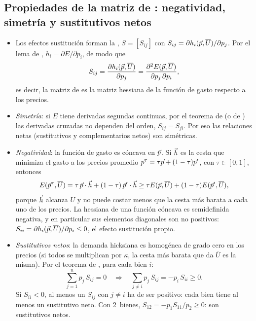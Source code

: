 \documentclass[11pt]{article}
\begin{document}
\subsection{Propiedades de la matriz de :\cortetitulo{} negatividad, simetría y sustitutivos netos}\label{der:matriz-slutsky}

\begin{itemize}
\item Los efectos sustitución forman la , $S=[S_{ij}]$ con $S_{ij}=\partial h_i(\vec{p},\overline{U})/\partial p_j$. Por el lema de , $h_i=\partial E/\partial p_i$, de modo que
  \begin{equation*}
  S_{ij}=\frac{\partial h_i(\vec{p},\overline{U})}{\partial p_j}=\frac{\partial^2E(\vec{p},\overline{U})}{\partial p_j\,\partial p_i},
  \end{equation*}
  es decir, la matriz de  es la matriz hessiana de la función de gasto respecto a los precios.
\item \emph{Simetría}: si $E$ tiene derivadas segundas continuas, por el teorema de  (o de ) las derivadas cruzadas no dependen del orden, $S_{ij}=S_{ji}$. Por eso las relaciones netas (sustitutivos y complementarios netos) son simétricas.
\item \emph{Negatividad}: la función de gasto es cóncava en $\vec{p}$. Si $\vec{h}$ es la cesta que minimiza el gasto a los precios promedio $\vec{p}^{\tau}=\tau \vec{p}+(1-\tau)\vec{p}'$, con $\tau\in[0,1]$, entonces
  \begin{equation*}
  E(\vec{p}^{\tau},\overline{U})=\tau\,\vec{p}\cdot\vec{h}+(1-\tau)\,\vec{p}'\cdot\vec{h}\geq\tau E(\vec{p},\overline{U})+(1-\tau)E(\vec{p}',\overline{U}),
  \end{equation*}
  porque $\vec{h}$ alcanza $\overline{U}$ y no puede costar menos que la cesta más barata a cada uno de los precios. La hessiana de una función cóncava es semidefinida negativa, y en particular sus elementos diagonales son no positivos: $S_{ii}=\partial h_i(\vec{p},\overline{U})/\partial p_i\leq 0$, el efecto sustitución propio.\findemo
\item \emph{Sustitutivos netos}: la demanda hicksiana es homogénea de grado cero en los precios (si todos se multiplican por $\kappa$, la cesta más barata que da $\overline{U}$ es la misma). Por el teorema de , para cada bien $i$:
  \begin{equation*}
  \sum_{j=1}^{n}p_j\,S_{ij}=0\quad\Longrightarrow\quad\sum_{j\neq i}p_j\,S_{ij}=-p_i\,S_{ii}\geq 0.
  \end{equation*}
  Si $S_{ii}<0$, al menos un $S_{ij}$ con $j\neq i$ ha de ser positivo: cada bien tiene al menos un sustitutivo neto. Con 2~bienes, $S_{12}=-p_1S_{11}/p_2\geq 0$: son sustitutivos netos.\findemo
\end{itemize}
\end{document}
